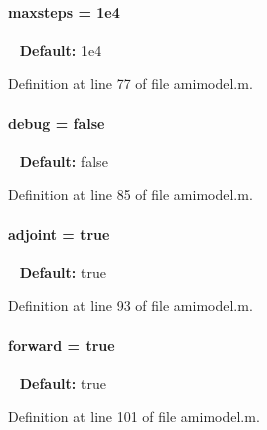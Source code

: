 \hypertarget{classamimodel_ac37622882dacee1f11688d4941ccb45e}{}
\paragraph[{maxsteps}]{\setlength{\rightskip}{0pt plus 5cm}maxsteps = 1e4}\label{classamimodel_ac37622882dacee1f11688d4941ccb45e}
~\newline
{\bfseries Default\+:} 1e4 

Definition at line 77 of file amimodel.\+m.

\hypertarget{classamimodel_a0514aabed091ee5e2f35766eb01eced6}{}
\paragraph[{debug}]{\setlength{\rightskip}{0pt plus 5cm}debug = false}\label{classamimodel_a0514aabed091ee5e2f35766eb01eced6}
~\newline
{\bfseries Default\+:} false 

Definition at line 85 of file amimodel.\+m.

\hypertarget{classamimodel_ab6d500b41cf50693452415caca31d32e}{}
\paragraph[{adjoint}]{\setlength{\rightskip}{0pt plus 5cm}adjoint = true}\label{classamimodel_ab6d500b41cf50693452415caca31d32e}
~\newline
{\bfseries Default\+:} true 

Definition at line 93 of file amimodel.\+m.

\hypertarget{classamimodel_a81e42e48c9c72814166c8f7cd414ce24}{}
\paragraph[{forward}]{\setlength{\rightskip}{0pt plus 5cm}forward = true}\label{classamimodel_a81e42e48c9c72814166c8f7cd414ce24}
~\newline
{\bfseries Default\+:} true 

Definition at line 101 of file amimodel.\+m.

\hypertarget{classamimodel_abdb5a42ffee3ca622484b53a322f1004}{}
